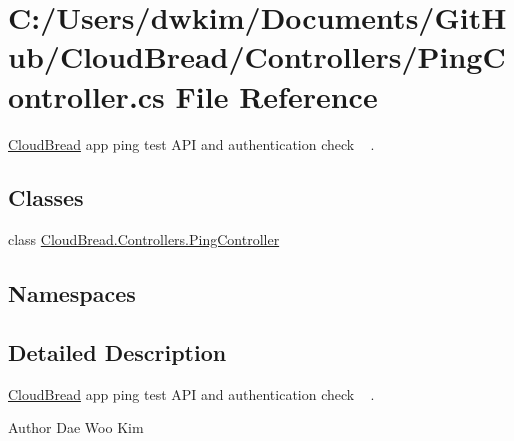 \hypertarget{a00163}{}\section{C\+:/\+Users/dwkim/\+Documents/\+Git\+Hub/\+Cloud\+Bread/\+Controllers/\+Ping\+Controller.cs File Reference}
\label{a00163}


\hyperlink{a00217}{Cloud\+Bread} app ping test A\+PI and authentication check ~\newline
.  


\subsection*{Classes}
\begin{DoxyCompactItemize}
\item 
class \hyperlink{a00083}{Cloud\+Bread.\+Controllers.\+Ping\+Controller}
\end{DoxyCompactItemize}
\subsection*{Namespaces}
\begin{DoxyCompactItemize}
\end{DoxyCompactItemize}


\subsection{Detailed Description}
\hyperlink{a00217}{Cloud\+Bread} app ping test A\+PI and authentication check ~\newline
. 

\begin{DoxyAuthor}{Author}
Dae Woo Kim 
\end{DoxyAuthor}
